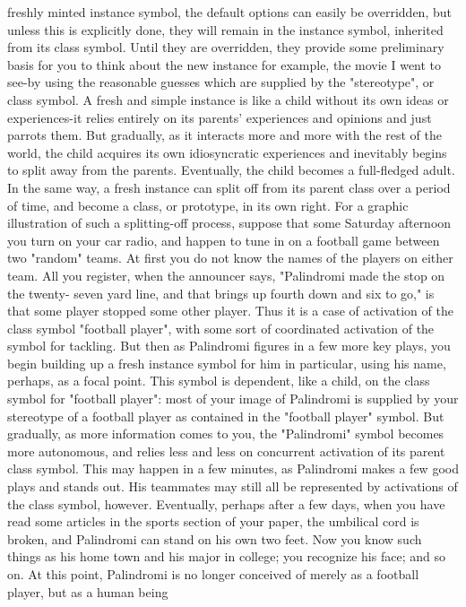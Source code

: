 freshly minted instance symbol, the default options can easily be overridden, but unless
this is explicitly done, they will remain in the instance symbol, inherited from its class
symbol. Until they are overridden, they provide some preliminary basis for you to think
about the new instance for example, the movie I went to see-by using the reasonable
guesses which are supplied by the "stereotype", or class symbol.
  A fresh and simple instance is like a child without its own ideas or experiences-it relies
entirely on its parents' experiences and opinions and just parrots them. But gradually, as it
interacts more and more with the rest of the world, the child acquires its own
idiosyncratic experiences and inevitably begins to split away from the parents.
Eventually, the child becomes a full-fledged adult. In the same way, a fresh instance can
split off from its parent class over a period of time, and become a class, or prototype, in
its own right.
  For a graphic illustration of such a splitting-off process, suppose that some Saturday
afternoon you turn on your car radio, and happen to tune in on a football game between
two "random" teams. At first you do not know the names of the players on either team.
All you register, when the announcer says, "Palindromi made the stop on the twenty-
seven yard line, and that brings up fourth down and six to go," is that some player
stopped some other player. Thus it is a case of activation of the class symbol "football
player", with some sort of coordinated activation of the symbol for tackling. But then as
Palindromi figures in a few more key plays, you begin building up a fresh instance
symbol for him in particular, using his name, perhaps, as a focal point. This symbol is
dependent, like a child, on the class symbol for "football player": most of your image of
Palindromi is supplied by your stereotype of a football player as contained in the
"football player" symbol. But gradually, as more information comes to you, the
"Palindromi" symbol becomes more autonomous, and relies less and less on concurrent
activation of its parent class symbol. This may happen in a few minutes, as Palindromi
makes a few good plays and stands out. His teammates may still all be represented by
activations of the class symbol, however. Eventually, perhaps after a few days, when you
have read some articles in the sports section of your paper, the umbilical cord is broken,
and Palindromi can stand on his own two feet. Now you know such things as his home
town and his major in college; you recognize his face; and so on. At this point,
Palindromi is no longer conceived of merely as a football player, but as a human being
